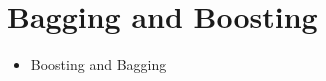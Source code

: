 \section{Bagging and Boosting}
\begin{itemize}
	\item Boosting and Bagging 
	\cite{BATISTA_2004} 
	\cite{CHABBOUH_2019} 
	\cite{DABLAIN_2021} 
	\cite{MAHMUDAH_2021} 
	\cite{SHARIFIFAR_2019}
\end{itemize}

